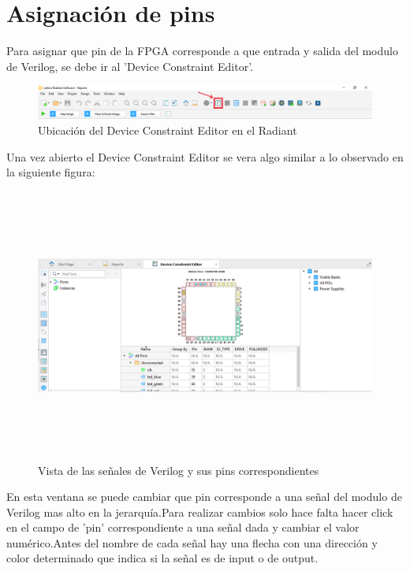 \documentclass{article}
\begin{document}
\section{Asignación de pins}
Para asignar que pin de la FPGA corresponde a que entrada y salida del modulo de Verilog, se debe ir al 'Device Constraint Editor'.
	\begin{figure}[H]
	\centering
	\includegraphics[width=\textwidth]{Imagenes/pins.png}
	\caption{Ubicación del Device Constraint Editor en el Radiant}
	\end{figure}
	
 Una vez abierto el Device Constraint Editor se vera algo similar a lo observado en la siguiente figura:
 	\begin{figure}[H]
 	\centering
	\includegraphics[height=9cm,width=16cm]{Imagenes/DeviceConstraintEditor.png}
	\caption{Vista de las señales de Verilog y sus pins correspondientes}
	\end{figure}
 En esta ventana se puede cambiar que pin corresponde a una señal del modulo de Verilog mas alto en la jerarquía.Para realizar cambios solo hace falta hacer click en el campo de 'pin' correspondiente a una señal dada y cambiar el valor numérico.Antes del nombre de cada señal hay una flecha con una dirección y color determinado que indica si la señal es de input o de output.
 
\end{document}
